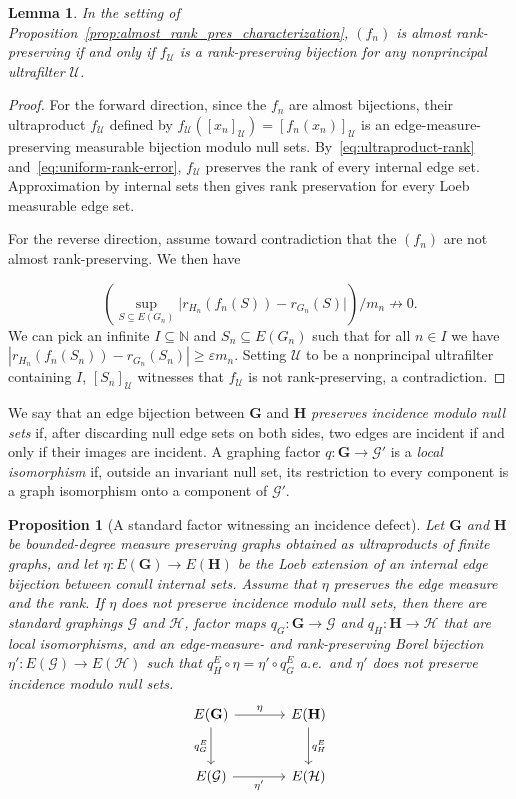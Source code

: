 \documentclass{article}
\theoremstyle{plain}
\newtheorem{lem}[thm]{Lemma}
\newtheorem{prop}[thm]{Proposition}
\theoremstyle{definition}
\newcommand{\N}{\mathbb{N}}
\newcommand{\cG}{\mathcal{G}}
\newcommand{\cU}{\mathcal{U}}
\newcommand{\cH}{\mathcal{H}}
\begin{document}
\begin{lem} \label{lem:almost_rank_pres_eqv_ultra_weak_iso}
    In the setting of Proposition~\ref{prop:almost_rank_pres_characterization}, $(f_n)$ is almost rank-preserving if and only if $f_{\cU}$ is a rank-preserving bijection for any nonprincipal ultrafilter $\cU$.
\end{lem}
\begin{proof}
    For the forward direction, since the $f_n$ are almost bijections, their ultraproduct $f_{\cU}$ defined by $f_{\cU}([x_n]_{\cU})=[f_n(x_n)]_{\cU}$  is an edge-measure-preserving measurable bijection modulo null sets. By~\eqref{eq:ultraproduct-rank} and~\eqref{eq:uniform-rank-error}, $f_{\cU}$ preserves the rank of every internal edge set. Approximation by internal sets then gives rank preservation for every Loeb measurable edge set.

    For the reverse direction, assume toward contradiction that the $(f_n)$ are not almost rank-preserving. We then have %
    
    \[%
    \left(\sup_{S \subseteq E(G_n)} \big|r_{H_n}(f_n(S)) - r_{G_n}(S)\big|\right) \bigg/ {m_n} \nrightarrow 0.\]
    We can pick an infinite $I \subseteq \N$ and $S_n \subseteq E(G_n)$ such that for all $n \in I$ we have %
    $|r_{H_n}(f_n(S_n)) - r_{G_n}(S_n)| \geq \varepsilon m_n$. Setting $\cU$ to be a nonprincipal ultrafilter containing $I$, $[S_n]_{\cU}$ witnesses that $f_{\cU}$ is not rank-preserving, a contradiction. 
\end{proof}

We say that an edge bijection between $\mathbf{G}$ and $\mathbf{H}$ \emph{preserves incidence modulo null sets} if, after discarding null edge sets on both sides, two edges are incident if and only if their images are incident. A graphing factor $q:\mathbf G\to\cG'$ is a \emph{local isomorphism} if, outside an invariant null set, its restriction to every component is a graph isomorphism onto a component of $\cG'$.

\begin{prop}[A standard factor witnessing an incidence defect]\label{prop:standard-factor-witness}
Let $\mathbf G$ and $\mathbf H$ be bounded-degree measure preserving graphs obtained as ultraproducts of finite graphs, and let $\eta:E(\mathbf G)\to E(\mathbf H)$ be the Loeb extension of an internal edge bijection between conull internal sets. Assume that $\eta$ preserves the edge measure and the rank. If $\eta$ does not preserve incidence modulo null sets, then there are standard graphings $\cG$ and $\cH$, factor maps $q_G:\mathbf G\to\cG$ and $q_H: \mathbf H \to \cH$ that are local isomorphisms, and an edge-measure- and rank-preserving Borel bijection $\eta':E(\cG)\to E(\cH)$ such that $q_H^E\circ\eta=\eta'\circ q_G^E$ a.e.\ and $\eta'$ does not preserve incidence modulo null sets.
\[
\begin{tikzcd}[column sep=large,row sep=large]
E(\mathbf{G}) \arrow[r,"\eta"]
     \arrow[d,"q_G^E"']
&
E(\mathbf{H}) \arrow[d,"q_H^E"]
\\
E(\cG) \arrow[r,"\eta'"']
&
E(\cH)
\end{tikzcd}
\]
\end{prop}
\end{document}
